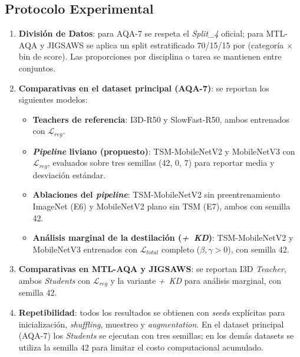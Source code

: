 \subsection{Protocolo Experimental}
\begin{enumerate}
    \item \textbf{División de Datos}: para AQA-7 se respeta el \textit{Split\_4} oficial; para MTL-AQA y JIGSAWS se aplica un split estratificado 70/15/15 por (categoría $\times$ bin de score). Las proporciones por disciplina o tarea se mantienen entre conjuntos.

    \item \textbf{Comparativas en el dataset principal (AQA-7)}: se reportan los siguientes modelos:
    \begin{itemize}
        \item \textbf{Teachers de referencia}: I3D-R50 y SlowFast-R50, ambos entrenados con $\mathcal{L}_{reg}$.
        \item \textbf{\textit{Pipeline} liviano (propuesto)}: TSM-MobileNetV2 y MobileNetV3 con $\mathcal{L}_{reg}$, evaluados sobre tres semillas (42, 0, 7) para reportar media y desviación estándar.
        \item \textbf{Ablaciones del \textit{pipeline}}: TSM-MobileNetV2 sin preentrenamiento ImageNet (E6) y MobileNetV2 plano sin \ac{TSM} (E7), ambos con semilla 42.
        \item \textbf{Análisis marginal de la destilación (\textit{+~KD})}: TSM-MobileNetV2 y MobileNetV3 entrenados con $\mathcal{L}_{total}$ completo ($\beta, \gamma > 0$), con semilla 42.
    \end{itemize}

    \item \textbf{Comparativas en MTL-AQA y JIGSAWS}: se reportan I3D \textit{Teacher}, ambos \textit{Students} con $\mathcal{L}_{reg}$ y la variante \textit{+~KD} para análisis marginal, con semilla 42.

    \item \textbf{Repetibilidad}: todos los resultados se obtienen con \textit{seeds} explícitas para inicialización, \textit{shuffling}, muestreo y \textit{augmentation}. En el dataset principal (AQA-7) los \textit{Students} se ejecutan con tres semillas; en los demás datasets se utiliza la semilla 42 para limitar el costo computacional acumulado.
\end{enumerate}

